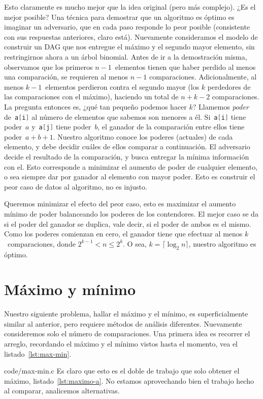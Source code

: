   Esto claramente es mucho mejor que la idea original
  (pero más complejo).
  ¿Es el mejor posible?
  Una técnica para demostrar que un algoritmo es óptimo
  es imaginar un adversario,
  que en cada paso responde lo peor posible
  (consistente con sus respuestas anteriores,
   claro está).
  Nuevamente consideramos el modelo de construir un DAG
  que nos entregue el máximo y el segundo mayor elemento,
  sin restringirnos ahora a un árbol binomial.
  Antes de ir a la demostración misma,
  observamos que los primeros \(n - 1\)~elementos
  tienen que haber perdido al menos una comparación,
  se requieren al menos \(n - 1\) comparaciones.
  Adicionalmente,
  al menos \(k - 1\)~elementos perdieron contra el segundo mayor
  (los \(k\) perdedores de las comparaciones con el máximo),
  haciendo un total de \(n + k - 2\) comparaciones.
  La pregunta entonces es,
  ¿qué tan pequeño podemos hacer \(k\)?
  Llamemos \emph{poder} de~\lstinline[language = C]!a[i]!
  al número de elementos que sabemos son menores a él.
  Si~\lstinline[language = C]!a[i]! tiene poder~\(a\)
  y~\lstinline[language = C]!a[j]! tiene poder~\(b\),
  el ganador de la comparación entre ellos tiene poder~\(a + b + 1\).
  Nuestro algoritmo conoce los poderes (actuales) de cada elemento,
  y debe decidir cuáles de ellos comparar a continuación.
  El adversario decide el resultado de la comparación,
  y busca entregar la mínima información con el.
  Esto corresponde a minimizar el aumento de poder de cualquier elemento,
  o sea siempre dar por ganador al elemento con mayor poder.
  Esto es construir el peor caso de datos al algoritmo,
  no es injusto.

  Queremos minimizar el efecto del peor caso,
  esto es maximizar el aumento mínimo de poder
  balanceando los poderes de los contendores.
  El mejor caso se da si el poder del ganador se duplica,
  vale decir,
  si el poder de ambos es el mismo.
  Como los poderes comienzan en cero,
  el ganador tiene que efectuar al menos \(k\)~comparaciones,
  donde \(2^{k - 1} < n \le 2^k\).
  O sea,
  \(k = \lceil \log_2 n \rceil\),
  nuestro algoritmo es óptimo.

\section{Máximo y mínimo}
\label{sec:maximo-minimo}

  Nuestro siguiente problema,
  hallar el máximo y el mínimo,
  es superficialmente similar al anterior,
  pero requiere métodos de análisis diferentes.
  Nuevamente consideremos solo el número de comparaciones.
  Una primera idea es recorrer el arreglo,
  recordando el máximo y el mínimo vistos hasta el momento,
  vea el listado~\ref{lst:max-min}.
  
                   {code/max-min.c}
  Es claro que esto es el doble de trabajo que solo obtener el máximo,
  listado~\ref{lst:maximo-a}.
  No estamos aprovechando bien el trabajo hecho al comparar,
  analicemos alternativas.

